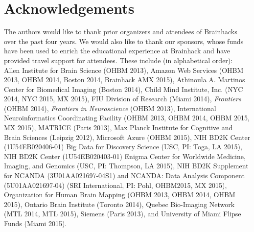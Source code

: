 \documentclass[11pt]{bmc_article_s50}
\begin{document}
\section*{Acknowledgements}
The authors would like to thank prior organizers and attendees of Brainhacks over the past four years. We would also like to thank our sponsors, whose funds have been used to enrich the educational experience at Brainhack and have provided travel support for attendees. These include (in alphabetical order): Allen Institute for Brain Science (OHBM 2013), Amazon Web Services (OHBM 2013, OHBM 2014, Boston 2014, Brainhack AMX 2015), Athinoula A. Martinos Center for Biomedical Imaging (Boston 2014), Child Mind Institute, Inc. (NYC 2014, NYC 2015, MX 2015), FIU Division of Research (Miami 2014), \emph{Frontiers} (OHBM 2014), \emph{Frontiers in Neuroscience} (OHBM 2013), International Neuroinformatics Coordinating Facility (OHBM 2013, OHBM 2014, OHBM 2015, MX 2015), MATRICE (Paris 2013), Max Planck Institute for Cognitive and Brain Sciences (Leipzig 2012), Microsoft Azure (OHBM 2015), NIH BD2K Center (1U54EB020406-01) Big Data for Discovery Science (USC, PI: Toga, LA 2015), NIH BD2K Center (1U54EB020403-01) Enigma Center for Worldwide Medicine, Imaging, and Genomics (USC, PI: Thompson, LA 2015), NIH BD2K Supplement for NCANDA (3U01AA021697-04S1) and NCANDA: Data Analysis Component (5U01AA021697-04) (SRI International, PI: Pohl, OHBM2015, MX 2015), Organization for Human Brain Mapping (OHBM 2013, OHBM 2014, OHBM 2015), Ontario Brain Institute (Toronto 2014), Quebec Bio-Imaging Network (MTL 2014, MTL 2015), Siemens (Paris 2013), and University of Miami Flipse Funds (Miami 2015).



 
 





\end{document}
